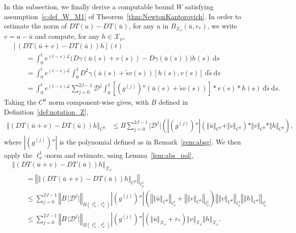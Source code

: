 \documentclass[10pt,a4paper]{article}
\theoremstyle{plain}
\renewcommand{\L}{\mathcal{L}}
\newcommand{\D}{\mathcal{D}}
\newcommand{\X}{\mathcal{X}}
\newcommand{\bu}{\bar{u}}
\newcommand{\1}{\mathbf{1}}
\newcommand{\rstar}{r_*}
\begin{document}
In this subsection, we finally derive a computable bound $W$ satisfying assumption~\eqref{e:def_W_M1} of Theorem~\ref{thm:NewtonKantorovich}. In order to estimate the norm of $DT(u) - DT(\bu)$, for any $u$ in $B_{\X_\nu}(\bu,\rstar)$, we write $v=u-\bu$ and compute, for any $h\in\X_\nu$,
\begin{align}
	& \left[ \left(DT \left( \bu + v \right) - DT \left( \bu \right) \right)h \right](t) \nonumber \\[1ex] 
	 & \qquad = 
	\int_{0}^{t} e^{ \left( t - s\right) \L } 
	\biggl( D\gamma \left( \bu\left(s\right) + v\left(s\right) \right) - D\gamma \left( \bu \left(s\right) \right) \biggr) h(s) \ \mbox{d}s
	\nonumber \\[1ex] 
	& \qquad = 	
 \int_{0}^{t} e^{ \left( t - s\right) \L} 
	 \int_{0}^{1} D^{2}\gamma \left( \bu \left(s\right) + \tilde{s} v\left(s\right) \right) 
		\left[ h(s), v(s) \right] \ \mbox{d} \tilde{s} \ \mbox{d}s
	\nonumber \\[1ex]
	& \qquad = 	
 \int_{0}^{t} e^{ \left( t - s\right) \L} \sum_{j=0}^{2J-1} \D^j
	 \int_{0}^{1}  \left[\left(g^{(j)}\right)'' \! \left( \bu \left(s\right) + \tilde{s} v\left(s\right)\right)\right] \ast v(s) \ast h(s)  \ \mbox{d} \tilde{s} \ \mbox{d}s .
	\label{eq:D2T}
\end{align}
Taking the $C^0$ norm component-wise gives, with $B$ defined in Definition~\ref{def:notation_Z},
\begin{align*}
\left\Vert \left(DT(\bu+ v) - DT(\bu)\right)h \right\Vert_{C^0} &\leq B\sum_{j=0}^{2J-1} \vert \D^j\vert  \left( \left \vert \left( g^{(j)} \right)'' \right \vert \left( \Vert \bar u \Vert_{C^{0}} +  \Vert v \Vert_{C^{0}} \right)  \ast \Vert v \Vert_{C^{0}} \ast \Vert h \Vert_{C^{0}}	\right),
\end{align*}
where $\left \vert \left( g^{(j)} \right)'' \right \vert$ is the polynomial defined as in Remark~\ref{rem:absg}. 
We then apply the $\ell^1_\nu$-norm and estimate, using Lemma~\ref{lem:abs_pol},
\begin{align}
\label{eq:W1}
&\left\Vert \left(DT(\bu+ v) - DT(\bu)\right)h \right\Vert_{\X_\nu} \nonumber\\
&\qquad = \left\Vert\left\Vert \left(DT(\bu+ v) - DT(\bu)\right)h \right\Vert_{C^0}\right\Vert_{\ell^1_\nu} \nonumber\\
&\qquad\leq\sum_{j=0}^{2J-1} \left\Vert B \, \vert\D^j\vert\right\Vert_{B(\ell^1_\nu,\ell^1_\nu)}   \left \vert \left( g^{(j)} \right)'' \right \vert \left( \left\Vert\left\Vert \bar u \right\Vert_{C^{0}}\right\Vert_{\ell^1_\nu} +  \left\Vert\left\Vert v \right\Vert_{C^{0}}\right\Vert_{\ell^1_\nu} \right)  \left\Vert\left\Vert v \right\Vert_{C^{0}}\right\Vert_{\ell^1_\nu} \left\Vert\left\Vert h \right\Vert_{C^{0}}\right\Vert_{\ell^1_\nu} \nonumber\\
&\qquad\leq  \sum_{j=0}^{2J-1} \left\Vert B \, \vert\D^j\vert\right\Vert_{B(\ell^1_\nu,\ell^1_\nu)} \left \vert \left( g^{(j)} \right)'' \right \vert \left( \left\Vert \bar u \right\Vert_{\X_\nu} + \rstar \right) \left\Vert v \right\Vert_{\X_\nu}  \left\Vert h \right\Vert_{\X_\nu}.
\end{align}
\end{document}
